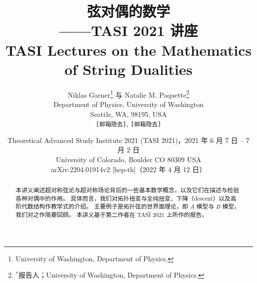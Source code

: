 \documentclass[11pt,a4paper]{article}
\begin{document}
\title{\bfseries 弦对偶的数学\\[0.4em]
       \large ——TASI 2021 讲座\\[0.6em]
       \normalsize\mdseries TASI Lectures on the Mathematics of String Dualities}
\author{Niklas Garner\thanks{University of Washington, Department of Physics.}
        \quad 与 \quad
        Natalie M. Paquette\thanks{$^*$报告人；University of Washington, Department of Physics.}\\[0.3em]
        \small Department of Physics, University of Washington\\
        \small Seattle, WA, 98195, USA\\
        \small \texttt{[邮箱隐去]}, \texttt{[邮箱隐去]}}
\date{\small Theoretical Advanced Study Institute 2021 (TASI 2021)，2021 年 6 月 7 日 -- 7 月 2 日\\
      \small University of Colorado, Boulder CO 80309 USA\\[0.2em]
      \small arXiv:2204.01914v2 [hep-th]（2022 年 4 月 12 日）}
\maketitle

\begin{abstract}
\noindent
本讲义阐述超对称弦论与超对称场论背后的一些基本数学概念，以及它们在描述与检验各种对偶中的作用。
具体而言，我们对拓扑扭变与全纯扭变、下降（descent）以及高阶代数结构作教学式的介绍。
主要例子是拓扑弦的世界面理论，即 $A$ 模型与 $B$ 模型，我们对之作简要回顾。
本讲义基于第二作者在 TASI 2021 上所作的报告。
\end{abstract}
\end{document}
